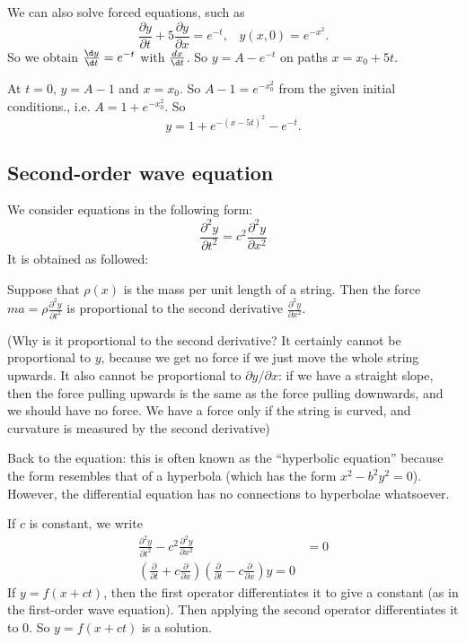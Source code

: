 \documentclass[a4paper]{article}
\begin{document}
We can also solve forced equations, such as
\[
\frac{\partial y}{\partial t} + 5\frac{\partial y}{\partial x} = e^{-t},\;\;\; y(x, 0) = e^{-x^2}.
\]
So we obtain $\frac{\d y}{\d t} = e^{-t}$ with $\frac{d x}{\d t}$. So $y = A - e^{-t}$ on paths $x = x_0 + 5t$.

At $t = 0$, $y = A - 1$ and $x = x_0$. So $A - 1 = e^{-x_0^2}$ from the given initial conditions., i.e. $A = 1 + e^{-x_0^2}$. So
\[
y = 1 + e^{-(x - 5t)^2} - e^{-t}.
\]
\subsection{Second-order wave equation}
We consider equations in the following form:
\[
\frac{\partial ^2 y}{\partial t^2} = c^2 \frac{\partial^2 y}{\partial x^2}
\]
It is obtained as followed:


Suppose that $\rho(x)$ is the mass per unit length of a string. Then the force $\displaystyle ma = \rho \frac{\partial ^2 y}{\partial t^2}$ is proportional to the second derivative $\displaystyle\frac{\partial^2 y}{\partial x^2}$.

(Why is it proportional to the second derivative? It certainly cannot be proportional to $y$, because we get no force if we just move the whole string upwards. It also cannot be proportional to $\partial y/\partial x$: if we have a straight slope, then the force pulling upwards is the same as the force pulling downwards, and we should have no force. We have a force only if the string is curved, and curvature is measured by the second derivative)

Back to the equation: this is often known as the ``hyperbolic equation'' because the form resembles that of a hyperbola (which has the form $x^2 - b^2 y^2 = 0$). However, the differential equation has no connections to hyperbolae whatsoever.

If $c$ is constant, we write
\begin{align*}
  \frac{\partial ^2 y}{\partial t^2} - c^2 \frac{\partial^2 y}{\partial x^2} &= 0\\
  \left(\frac{\partial}{\partial t} + c\frac{\partial}{\partial x}\right)\left(\frac{\partial}{\partial t} - c\frac{\partial}{\partial x}\right) y = 0
\end{align*}
If $y = f(x + ct)$, then the first operator differentiates it to give a constant (as in the first-order wave equation). Then applying the second operator differentiates it to $0$. So $y = f(x + ct)$ is a solution.
\end{document}
